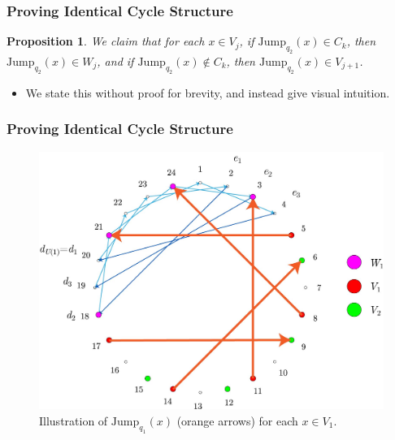 \documentclass{beamer}
\theoremstyle{plain}
\newtheorem{Prop}[theorem]{Proposition}
\theoremstyle{definition}
\theoremstyle{remark}
\renewcommand{\'}{\hspace{0.5mm}'}		%
\begin{document}
\begin{frame}
\frametitle{Proving Identical Cycle Structure}

	\begin{Prop}
		We claim that for each $x \in V_j$, 
		if $\mathrm{Jump}_{q_2}(x) \in C_k$, 
		then $\mathrm{Jump}_{q_2}(x) \in W_j$, 
		and if $\mathrm{Jump}_{q_2}(x) \notin C_k$, 
		then $\mathrm{Jump}_{q_2}(x) \in V_{j + 1}$. 
	\end{Prop}
	
	\begin{itemize}
		\item We state this without proof for brevity, and 
		instead give visual intuition. 
	\end{itemize}


\end{frame}




\begin{frame}
\frametitle{Proving Identical Cycle Structure}

	\begin{figure}
		\includegraphics[scale=0.15]{circ_24_VW.jpg}
		\caption{Illustration of $\mathrm{Jump}_{q_1}(x)$
		(orange arrows) for each $x \in V_1$. }
	\end{figure}


\end{frame}
\end{document}
